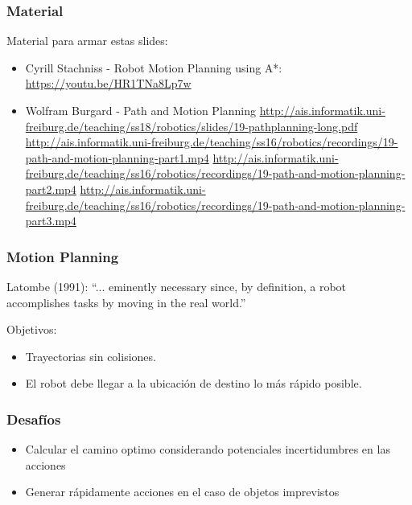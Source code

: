 \begin{frame}
	\frametitle{Material}
	
	Material para armar estas slides:
	\begin{itemize}
		\item Cyrill Stachniss - Robot Motion Planning using A*: \url{https://youtu.be/HR1TNa8Lp7w}
		\item Wolfram Burgard - Path and Motion Planning \url{http://ais.informatik.uni-freiburg.de/teaching/ss18/robotics/slides/19-pathplanning-long.pdf}
		\url{http://ais.informatik.uni-freiburg.de/teaching/ss16/robotics/recordings/19-path-and-motion-planning-part1.mp4}
		\url{http://ais.informatik.uni-freiburg.de/teaching/ss16/robotics/recordings/19-path-and-motion-planning-part2.mp4}
		\url{http://ais.informatik.uni-freiburg.de/teaching/ss16/robotics/recordings/19-path-and-motion-planning-part3.mp4}
	\end{itemize}
	
\end{frame}

\begin{frame}
	\frametitle{Motion Planning}
	
	Latombe (1991): ``... eminently necessary since, by definition, a robot accomplishes tasks by moving in the real world.''
	
	Objetivos:
	\begin{itemize}
		\item Trayectorias sin colisiones.
		\item El robot debe llegar a la ubicación de destino lo más rápido posible.
	\end{itemize}
\end{frame}

\begin{frame}
	\frametitle{Desafíos}
	
	\begin{itemize}
		\item Calcular el camino optimo considerando potenciales incertidumbres en las acciones
		\item Generar rápidamente acciones en el caso de objetos imprevistos
	\end{itemize}
	
\end{frame}



